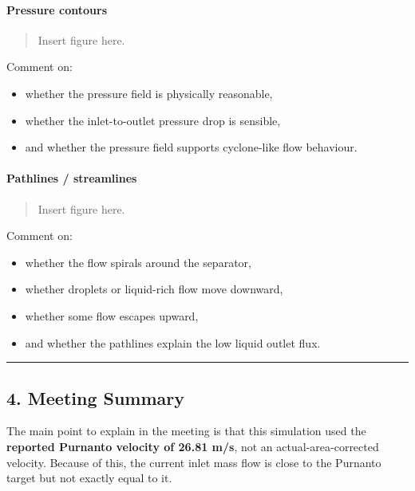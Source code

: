 \documentclass[
  11pt,
]{article}
\providecommand{\tightlist}{%
  \setlength{\itemsep}{0pt}\setlength{\parskip}{0pt}}
\begin{document}
\paragraph{Pressure contours}\label{pressure-contours}

\begin{quote}
Insert figure here.
\end{quote}

Comment on:

\begin{itemize}
\tightlist
\item
  whether the pressure field is physically reasonable,
\item
  whether the inlet-to-outlet pressure drop is sensible,
\item
  and whether the pressure field supports cyclone-like flow behaviour.
\end{itemize}

\paragraph{Pathlines / streamlines}\label{pathlines-streamlines}

\begin{quote}
Insert figure here.
\end{quote}

Comment on:

\begin{itemize}
\tightlist
\item
  whether the flow spirals around the separator,
\item
  whether droplets or liquid-rich flow move downward,
\item
  whether some flow escapes upward,
\item
  and whether the pathlines explain the low liquid outlet flux.
\end{itemize}

\begin{center}\rule{0.5\linewidth}{0.5pt}\end{center}

\subsection{4. Meeting Summary}\label{meeting-summary}

The main point to explain in the meeting is that this simulation used
the \textbf{reported Purnanto velocity of 26.81 m/s}, not an
actual-area-corrected velocity. Because of this, the current inlet mass
flow is close to the Purnanto target but not exactly equal to it.
\end{document}
